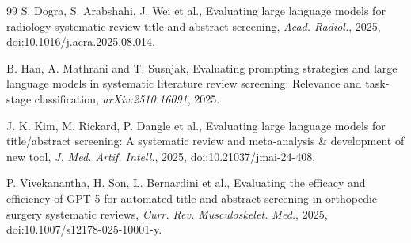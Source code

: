 \documentclass[12pt,a4paper]{article}
\begin{document}
\begin{thebibliography}{99}
 S. Dogra, S. Arabshahi, J. Wei et al., Evaluating large language models for
radiology systematic review title and abstract screening, \textit{Acad. Radiol.}, 2025,
doi:10.1016/j.acra.2025.08.014.

 B. Han, A. Mathrani and T. Susnjak, Evaluating prompting strategies and large
language models in systematic literature review screening: Relevance and task-stage
classification, \textit{arXiv:2510.16091}, 2025.

 J. K. Kim, M. Rickard, P. Dangle et al., Evaluating large language models for
title/abstract screening: A systematic review and meta-analysis \& development of new tool,
\textit{J. Med. Artif. Intell.}, 2025, doi:10.21037/jmai-24-408.

 P. Vivekanantha, H. Son, L. Bernardini et al., Evaluating the efficacy and
efficiency of GPT-5 for automated title and abstract screening in orthopedic surgery systematic
reviews, \textit{Curr. Rev. Musculoskelet. Med.}, 2025, doi:10.1007/s12178-025-10001-y.

\end{thebibliography}
\end{document}
